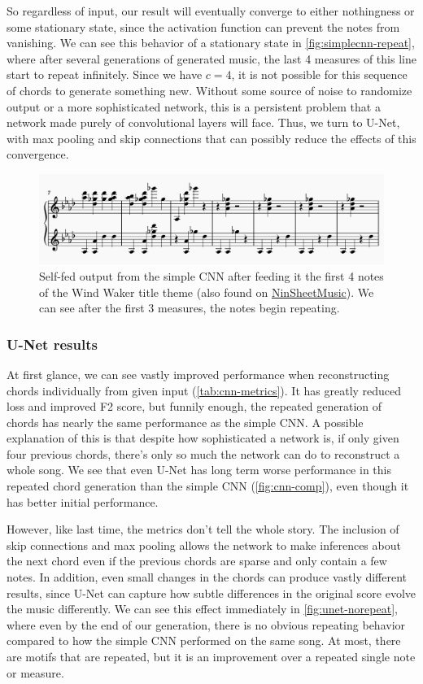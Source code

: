 \documentclass[
	a4paper, %
	10pt, %
	unnumberedsections, %
	twoside, %
]{LTJournalArticle}
\begin{document}
So regardless of input, our result will eventually converge to either nothingness or some stationary state, since the activation function can prevent the notes from vanishing. We can see this behavior of a stationary state in \autoref{fig:simplecnn-repeat}, where after several generations of generated music, the last 4 measures of this line start to repeat infinitely. Since we have $c=4$, it is not possible for this sequence of chords to generate something new. Without some source of noise to randomize output or a more sophisticated network, this is a persistent problem that a network made purely of convolutional layers will face. Thus, we turn to U-Net, with max pooling and skip connections that can possibly reduce the effects of this convergence.

\begin{figure}
    \centering
    \includegraphics[width=0.7\linewidth]{images/repeated-output-notes.png}
    \caption{Self-fed output from the simple CNN after feeding it the first 4 notes of the Wind Waker title theme (also found on \href{https://www.ninsheetmusic.org/browse/series/TheLegendofZelda}{NinSheetMusic}). We can see after the first 3 measures, the notes begin repeating.}
    \label{fig:simplecnn-repeat}
\end{figure}

\subsubsection{U-Net results}

At first glance, we can see vastly improved performance when reconstructing chords individually from given input (\autoref{tab:cnn-metrics}). It has greatly reduced loss and improved F2 score, but funnily enough, the repeated generation of chords has nearly the same performance as the simple CNN. A possible explanation of this is that despite how sophisticated a network is, if only given four previous chords, there's only so much the network can do to reconstruct a whole song. We see that even U-Net has long term worse performance in this repeated chord generation than the simple CNN (\autoref{fig:cnn-comp}), even though it has better initial performance.

However, like last time, the metrics don't tell the whole story. The inclusion of skip connections and max pooling allows the network to make inferences about the next chord even if the previous chords are sparse and only contain a few notes. In addition, even small changes in the chords can produce vastly different results, since U-Net can capture how subtle differences in the original score evolve the music differently. We can see this effect immediately in \autoref{fig:unet-norepeat}, where even by the end of our generation, there is no obvious repeating behavior compared to how the simple CNN performed on the same song. At most, there are motifs that are repeated, but it is an improvement over a repeated single note or measure.
\end{document}
